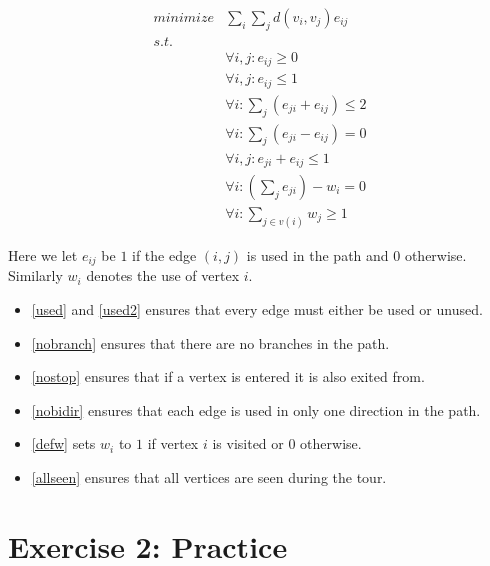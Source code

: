 \documentclass[11pt,a4paper]{article}
\begin{document}
\label{ex13}
\begin{align}
    minimize & \sum_i \sum_j d(v_i, v_j) e_{ij} \nonumber \\
    s.t.     & \nonumber \\ 
             & \forall i, j: e_{ij} \geq 0 \label{used} \\
             & \forall i, j: e_{ij} \leq 1 \label{used2} \\
             & \forall i: \sum_j (e_{ji} + e_{ij}) \leq 2 \label{nobranch} \\
             & \forall i: \sum_j (e_{ji} - e_{ij}) = 0 \label{nostop}\\
             & \forall i,j: e_{ji} + e_{ij} \leq 1 \label{nobidir} \\
             & \forall i: (\sum_j e_{ji}) - w_i = 0 \label{defw} \\
             & \forall i: \sum_{j \in v(i)} w_j \geq 1 \label{allseen}
\end{align}

Here we let $e_{ij}$ be $1$ if the edge $(i,j)$ is used in the path and $0$ otherwise.
Similarly $w_i$ denotes the use of vertex $i$.

\begin{itemize}
    \item \autoref{used} and \autoref{used2} ensures that every edge must either be used or unused.
    \item \autoref{nobranch} ensures that there are no branches in the path.
    \item \autoref{nostop} ensures that if a vertex is entered it is also exited from.
    \item \autoref{nobidir} ensures that each edge is used in only one direction in the path.
    \item \autoref{defw} sets $w_i$ to $1$ if vertex $i$ is visited or $0$ otherwise.
    \item \autoref{allseen} ensures that all vertices are seen during the tour.
\end{itemize}


\section{Exercise 2: Practice}
\end{document}
